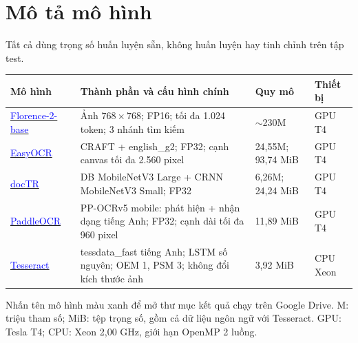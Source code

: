 \section{Mô tả mô hình}
Tất cả dùng trọng số huấn luyện sẵn, không huấn luyện hay tinh chỉnh trên tập test.

\begingroup\fontsize{9.5}{11}\selectfont
\hypersetup{colorlinks=true,urlcolor=blue,citecolor=black}
\setlength{\tabcolsep}{3pt}\renewcommand{\arraystretch}{1.08}
\begin{tabularx}{\linewidth}{@{}p{3.0cm}Yp{3.0cm}p{1.55cm}@{}}
\toprule
\textbf{Mô hình} & \textbf{Thành phần và cấu hình chính} & \textbf{Quy mô} & \textbf{Thiết bị} \\
\midrule
\href{https://drive.google.com/drive/folders/1wB9eSuFXprUlT02RjaxQ2TkC1kDmldYf?usp=sharing}{\textcolor{blue}{Florence-2-base}}~\cite{florence} & Ảnh $768\!\times\!768$; FP16; tối đa 1.024 token; 3 nhánh tìm kiếm & $\sim$230M & GPU T4 \\
\href{https://drive.google.com/drive/folders/1FuShUqY_s74tVkic_I_YohYlBUN1PYTE?usp=sharing}{\textcolor{blue}{EasyOCR}}~\cite{easyocr} & CRAFT + english\_g2; FP32; cạnh canvas tối đa 2.560 pixel & 24,55M; 93,74 MiB & GPU T4 \\
\href{https://drive.google.com/drive/folders/1vosBxRMPkBXYH8vZbonjkj5QCFsF_Zy8?usp=sharing}{\textcolor{blue}{docTR}}~\cite{doctr} & DB MobileNetV3 Large + CRNN MobileNetV3 Small; FP32 & 6,26M; 24,24 MiB & GPU T4 \\
\href{https://drive.google.com/drive/folders/1YRyvsGkRrzAg2VqZ2uAJkeus6ThK4WzA?usp=sharing}{\textcolor{blue}{PaddleOCR}}~\cite{paddle} & PP-OCRv5 mobile: phát hiện + nhận dạng tiếng Anh; FP32; cạnh dài tối đa 960 pixel & 11,89 MiB & GPU T4 \\
\href{https://drive.google.com/drive/folders/1ey57vggKSCMPVbHZfNsQTWAxhwMR9bcX?usp=sharing}{\textcolor{blue}{Tesseract}}~\cite{tesseract} & tessdata\_fast tiếng Anh; LSTM số nguyên; OEM 1, PSM 3; không đổi kích thước ảnh & 3,92 MiB & CPU Xeon \\
\bottomrule
\end{tabularx}
\endgroup
{\footnotesize Nhấn tên mô hình màu xanh để mở thư mục kết quả chạy trên Google Drive.
M: triệu tham số; MiB: tệp trọng số, gồm cả dữ liệu ngôn ngữ với
Tesseract. GPU: Tesla T4; CPU: Xeon 2,00 GHz, giới hạn OpenMP 2 luồng.\par}
